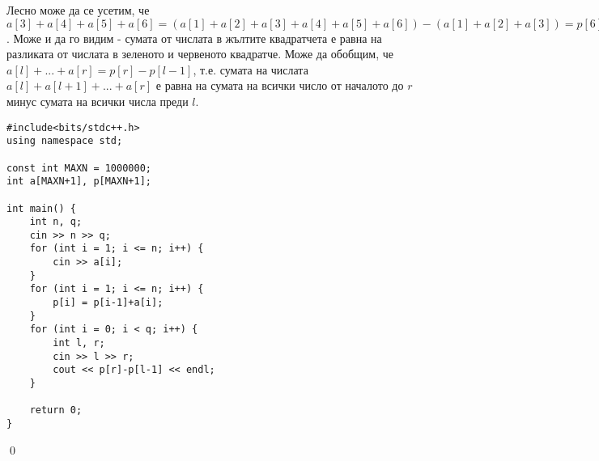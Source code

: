 \documentclass[]{article}
\newenvironment{solution}{\noindent{\bf Решение.}\hspace*{1em}}{\qed\par}
\begin{document}
\begin{solution}
\newline\newline
Лесно може да се усетим, че $a[3]+a[4]+a[5]+a[6]=(a[1]+a[2]+a[3]+a[4]+a[5]+a[6])-(a[1]+a[2]+a[3])=p[6]-p[3]$. Може и да го видим - сумата от числата в жълтите квадратчета е равна на разликата от числата в зеленото и червеното квадратче.\newline
Може да обобщим, че $a[l]+...+a[r]=p[r]-p[l-1]$, т.е. сумата на числата $a[l]+a[l+1]+...+a[r]$ е равна на сумата на всички число от началото до $r$ минус сумата на всички числа преди $l$.
\begin{verbatim}
#include<bits/stdc++.h>
using namespace std;

const int MAXN = 1000000;
int a[MAXN+1], p[MAXN+1];

int main() {
    int n, q;
    cin >> n >> q;
    for (int i = 1; i <= n; i++) {
        cin >> a[i];
    }
    for (int i = 1; i <= n; i++) {
        p[i] = p[i-1]+a[i];
    }
    for (int i = 0; i < q; i++) {
        int l, r;
        cin >> l >> r;
        cout << p[r]-p[l-1] << endl;
    }

    return 0;
}
\end{verbatim}
\end{solution}
\end{document}
